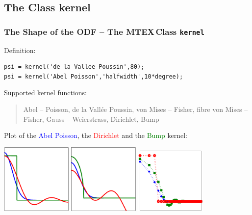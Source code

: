 \documentclass{beamer}
\newcommand{\MTEX}{{\bf {\color{red}M}TEX\,}}%
\begin{document}
\subsection*{The Class kernel}


\begin{frame}[fragile]
  \frametitle{The Shape of the ODF -- The \MTEX Class \texttt{\bf kernel}}

Definition:

\begin{lstlisting}
psi = kernel('de la Vallee Poussin',80);
psi = kernel('Abel Poisson','halfwidth',10*degree);
\end{lstlisting}

\medskip

Supported kernel functions:

\begin{quote}
  Abel -- Poisson, de la Vall\'ee Poussin, von Mises -- Fisher, fibre von Mises
  -- Fisher, Gauss -- Weierstrass, Dirichlet, Bump
\end{quote}

Plot of the \textcolor{blue}{Abel Poisson}, the \textcolor{red}{Dirichlet} and
the \textcolor{green}{Bump} kernel:

\begin{center}
  \includegraphics[width=3.5cm]{pic/K} \quad
  \includegraphics[width=3.5cm]{pic/RK} \quad
  \includegraphics[width=3.5cm]{pic/Fourier}
\end{center}
  
\end{frame}
\end{document}
